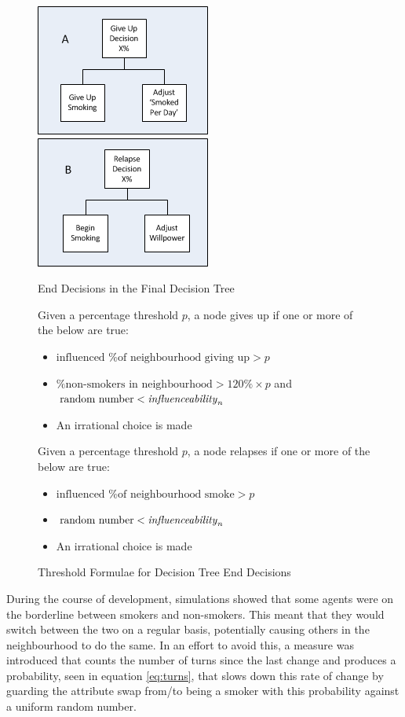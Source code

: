 \documentclass[]{report}
\begin{document}
\begin{figure}
\begin{center}
\includegraphics[scale=1]{End-DecA.png}
\includegraphics[scale=1]{End-DecB.png}
\end{center}
\caption{End Decisions in the Final Decision Tree}
\label{img:end-dec}
\end{figure}

\begin{figure}
Given a percentage threshold $p$, a node gives up if one or more of the below are true:
\begin{itemize}
\item $\text{influenced \% of neighbourhood giving up} > p$
\item $\text{\% non-smokers in neighbourhood} > 120\% \times p$ and $\text{random number} < \text{\emph{influenceability}}_{n}$
\item An irrational choice is made
\end{itemize}

Given a percentage threshold $p$, a node relapses if one or more of the below are true:
\begin{itemize}
\item $\text{influenced \% of neighbourhood smoke} > p$
\item $\text{random number} < \text{\emph{influenceability}}_{n}$
\item An irrational choice is made
\end{itemize}
\caption{Threshold Formulae for Decision Tree End Decisions}
\label{eq:end-thresh}
\end{figure}

During the course of development, simulations showed that some agents were on the borderline between smokers and non-smokers. This meant that they would switch between the two on a regular basis, potentially causing others in the neighbourhood to do the same. In an effort to avoid this, a measure was introduced that counts the number of turns since the last change and produces a probability, seen in equation \ref{eq:turns}, that slows down this rate of change by guarding the attribute swap from/to being a smoker with this probability against a uniform random number.
\end{document}
